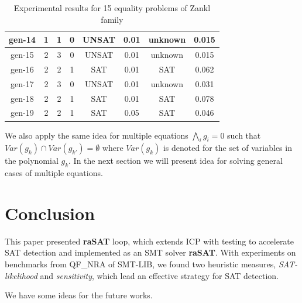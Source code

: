 \documentclass[runningheads,a4paper,oribibl]{llncs}
\begin{document}
{{\begin{table}
{\begin{tabular}[b]{|c|c|c|c|c|c|c|c|}
\hline
gen-14 & 1 & 1 & 0& UNSAT &0.01 & unknown &0.015\\
\hline
gen-15 & 2 & 3 & 0& UNSAT &0.01 & unknown &0.015\\
\hline
gen-16 & 2 & 2 & 1& SAT &0.01 & SAT &0.062\\
\hline
gen-17 & 2 & 3 & 0& UNSAT &0.01 & unknown &0.031\\
\hline
gen-18 & 2 & 2 & 1& SAT &0.01 & SAT &0.078\\
\hline
gen-19 & 2 & 2 & 1& SAT &0.05 & SAT &0.046\\
\hline
\end{tabular}
}
\caption{Experimental results for 15 equality problems of Zankl family}
\label{tab:eqexp}
\end{table}

We also apply the same idea for multiple equations $\bigwedge \limits_{i} g_i = 0$ such that $Var(g_k) \cap Var(g_{k'}) = \emptyset$ where $Var(g_k)$ is denoted for the set of variables in the polynomial $g_k$. In the next section we will present idea for solving general cases of multiple equations.
}

}



\section{Conclusion} \label{sec:conclusion and Future Work}

This paper presented {\bf raSAT} loop, which extends ICP with testing to accelerate
SAT detection and implemented as an SMT solver \textbf{raSAT}. 
With experiments on benchmarks from QF\_NRA of SMT-LIB, we found two heuristic measures, 
{\em SAT-likelihood} and {\em sensitivity}, which lead an effective strategy for SAT detection. 

We have some ideas for the future works.
\end{document}
